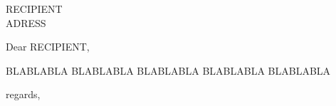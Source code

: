 \documentclass{letter}
\begin{document}
\begin{letter}{RECIPIENT\\ADRESS}
\opening{Dear RECIPIENT,}

BLABLABLA BLABLABLA BLABLABLA BLABLABLA BLABLABLA

\closing{regards,}
\end{letter}
\end{document}
